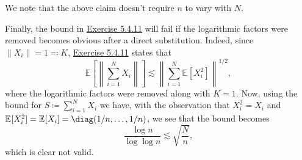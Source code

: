 \begin{answer}
\begin{enumerate}[(a)]
		      \begin{remark}
			      We note that the above claim doesn't require \(n\) to vary with \(N\).
		      \end{remark}

		      Finally, the bound in \hyperref[ex5.4.11]{Exercise 5.4.11} will fail if the logarithmic factors were removed becomes obvious after a direct substitution. Indeed, since \(\lVert X_i \rVert = 1 \eqqcolon K\), \hyperref[ex5.4.11]{Exercise 5.4.11} states that
		      \[
			      \mathbb{E}_{}\left[\left\lVert \sum_{i=1}^{N} X_i \right\rVert \right]
			      \lesssim \left\lVert \sum_{i=1}^{N} \mathbb{E}_{}[X_i^2] \right\rVert ^{1 / 2} ,
		      \]
		      where the logarithmic factors were removed along with \(K = 1\). Now, using the bound for \(S \coloneqq \sum_{i=1}^{N} X_i\) we have, with the observation that \(X_i^2 = X_i\) and \(\mathbb{E}_{}[X_i^2] = \mathbb{E}_{}[X_i] = \diag (1 / n, \dots , 1 / n)\), we see that the bound becomes
		      \[
			      \frac{\log n}{\log \log n}
			      \lesssim \sqrt{\frac{N}{n} },
		      \]
		      which is clear not valid.
	\end{enumerate}
\end{answer}

